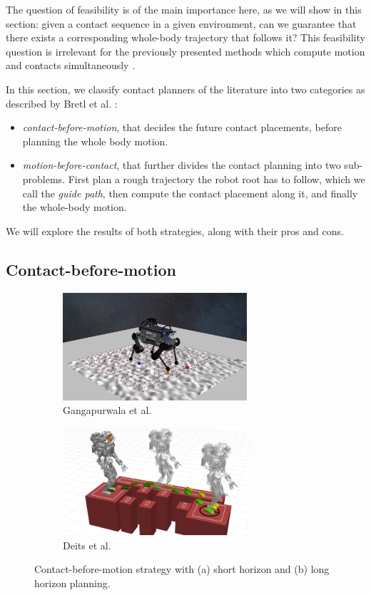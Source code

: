 The question of feasibility is of the main importance here, as we will show in this section: given a contact sequence in a given environment, can we guarantee that there exists a corresponding whole-body trajectory that follows it? 
This feasibility question is irrelevant for the previously presented methods which compute motion and contacts simultaneously \cite{Winkler2017_TO, carlos_2019}.

In this section, we classify contact planners of the literature into two categories as described by Bretl et al. \cite{bretl2006}:
\begin{itemize}
    \item \textit{contact-before-motion}, that decides the future contact placements, before planning the whole body motion.
    \item \textit{motion-before-contact}, that further divides the contact planning into two sub-problems. First plan a rough trajectory the robot root has to follow, which we call the \textit{guide path}, then compute the contact placement along it, and finally the whole-body motion.
\end{itemize}
We will explore the results of both strategies, along with their pros and cons.

\subsection{Contact-before-motion\label{subsub:contact-before-motion}}
\begin{figure}[ht]
    \centering
    \captionsetup[subfigure]{justification=centering}
    \begin{subfigure}[t]{0.48\linewidth}
    \includegraphics[width=\textwidth,height=4cm]{Figures/Chapter_SOTA//rloc_planning.png}
    \caption{Gangapurwala et al. \cite{RLOC}}
    \label{fig:cp_bm_0}
    \end{subfigure}
    \begin{subfigure}[t]{0.48\linewidth}
    \includegraphics[width=\textwidth,height=4cm]{Figures/Chapter_SOTA//MIP_deits.png}
    \caption{Deits et al. \cite{deits2014FootPlanMI}}
    \label{fig:cp_bm_1}
    \end{subfigure}
    \label{fig:cp_bm}
    \caption{Contact-before-motion strategy with (a) short horizon and (b) long horizon planning.}
\end{figure}

